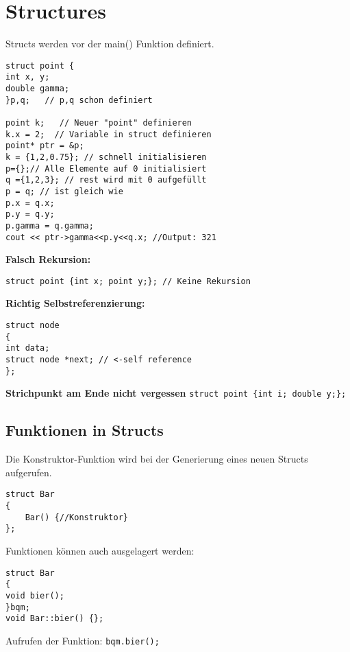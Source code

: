 \section{Structures}

Structs werden vor der main() Funktion definiert.
\begin{lstlisting}[mathescape]
struct point {
int x, y;
double gamma;
}p,q;   // p,q schon definiert

point k;   // Neuer "point" definieren
k.x = 2;  // Variable in struct definieren
point* ptr = &p;
k = {1,2,0.75}; // schnell initialisieren
p={};// Alle Elemente auf 0 initialisiert
q ={1,2,3}; // rest wird mit 0 aufgefüllt
p = q; // ist gleich wie
p.x = q.x; 
p.y = q.y;
p.gamma = q.gamma;
cout << ptr->gamma<<p.y<<q.x; //Output: 321
\end{lstlisting}

\textbf{Falsch Rekursion:} 
\begin{lstlisting}[mathescape]
struct point {int x; point y;}; // Keine Rekursion
\end{lstlisting}
\textbf{Richtig Selbstreferenzierung:} 
\begin{lstlisting}[mathescape]
struct node
{
int data;
struct node *next; // <-self reference
};
\end{lstlisting}
\textbf{Strichpunkt am Ende nicht vergessen} 
\texttt{struct point \{int i; double y;\};}

\subsection{Funktionen in Structs}
Die Konstruktor-Funktion wird bei der Generierung eines neuen Structs aufgerufen.
\begin{lstlisting}[mathescape]
struct Bar
{
	Bar() {//Konstruktor}
};
\end{lstlisting}
Funktionen können auch ausgelagert werden:
\begin{lstlisting}[mathescape]
struct Bar
{
void bier();
}bqm;
void Bar::bier() {};
\end{lstlisting}
Aufrufen der Funktion: \texttt{bqm.bier();}


























